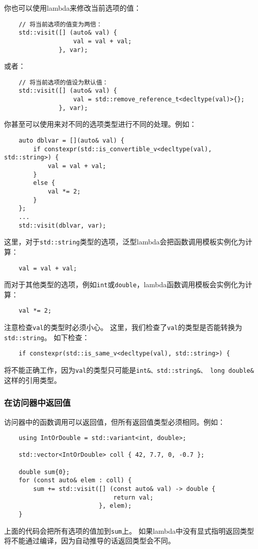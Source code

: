 你也可以使用lambda来修改当前选项的值：
\begin{lstlisting}
    // 将当前选项的值变为两倍：
    std::visit([] (auto& val) {
                   val = val + val;
               }, var);
\end{lstlisting}
或者：
\begin{lstlisting}
    // 将当前选项的值设为默认值：
    std::visit([] (auto& val) {
                   val = std::remove_reference_t<decltype(val)>{};
               }, var);
\end{lstlisting}
你甚至可以使用来对不同的选项类型进行不同的处理。例如：
\begin{lstlisting}
    auto dblvar = [](auto& val) {
        if constexpr(std::is_convertible_v<decltype(val), std::string>) {
            val = val + val;
        }
        else {
            val *= 2;
        }
    };
    ...
    std::visit(dblvar, var);
\end{lstlisting}
这里，对于\texttt{std::string}类型的选项，泛型lambda会把函数调用模板实例化为计算：
\begin{lstlisting}
    val = val + val;
\end{lstlisting}
而对于其他类型的选项，例如\texttt{int}或\texttt{double}，lambda函数调用模板会实例化为计算：
\begin{lstlisting}
    val *= 2;
\end{lstlisting}
注意检查\texttt{val}的类型时必须小心。
这里，我们检查了\texttt{val}的类型是否能转换为\texttt{std::string}。
如下检查：
\begin{lstlisting}
    if constexpr(std::is_same_v<decltype(val), std::string>) {
\end{lstlisting}
将不能正确工作，因为\texttt{val}的类型只可能是\texttt{int\&、std::string\&、
long double\&}这样的引用类型。

\subsubsection{在访问器中返回值}
访问器中的函数调用可以返回值，但所有返回值类型必须相同。例如：
\begin{lstlisting}
    using IntOrDouble = std::variant<int, double>;

    std::vector<IntOrDouble> coll { 42, 7.7, 0, -0.7 };

    double sum{0};
    for (const auto& elem : coll) {
        sum += std::visit([] (const auto& val) -> double {
                              return val;
                          }, elem);
    }
\end{lstlisting}
上面的代码会把所有选项的值加到\texttt{sum}上。
如果lambda中没有显式指明返回类型将不能通过编译，因为自动推导的话返回类型会不同。

